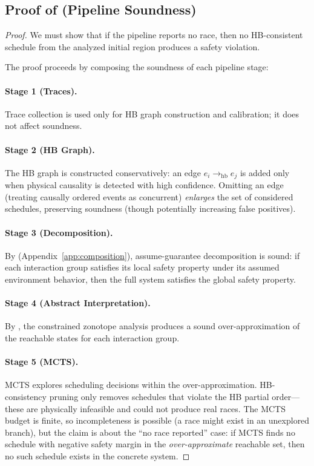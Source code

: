 \documentclass[11pt]{article}
\newcommand{\hb}{\rightarrow_{\mathrm{hb}}}
\begin{document}
\subsection{Proof of \texorpdfstring{}{Theorem 4.1} (Pipeline Soundness)}

\begin{proof}
We must show that if the pipeline reports no race, then no HB-consistent
schedule from the analyzed initial region produces a safety violation.

The proof proceeds by composing the soundness of each pipeline stage:

\paragraph{Stage 1 (Traces).} Trace collection is used only for
HB graph construction and calibration; it does not affect soundness.

\paragraph{Stage 2 (HB Graph).} The HB graph is constructed conservatively:
an edge $e_i \hb e_j$ is added only when physical causality is detected
with high confidence. Omitting an edge (treating causally ordered events
as concurrent) \emph{enlarges} the set of considered schedules, preserving
soundness (though potentially increasing false positives).

\paragraph{Stage 3 (Decomposition).} By  (Appendix~\ref{app:composition}),
assume-guarantee decomposition is sound: if each interaction group satisfies
its local safety property under its assumed environment behavior, then the
full system satisfies the global safety property.

\paragraph{Stage 4 (Abstract Interpretation).} By ,
the constrained zonotope analysis produces a sound over-approximation of the
reachable states for each interaction group.

\paragraph{Stage 5 (MCTS).} MCTS explores scheduling decisions within the
over-approximation. HB-consistency pruning only removes schedules that
violate the HB partial order---these are physically infeasible and could not
produce real races. The MCTS budget is finite, so incompleteness is
possible (a race might exist in an unexplored branch), but the claim is
about the ``no race reported'' case: if MCTS finds no schedule with negative
safety margin in the \emph{over-approximate} reachable set, then no such
schedule exists in the concrete system.


\end{proof}
\end{document}

